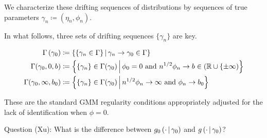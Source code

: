 \documentclass[11pt]{article}
\newcommand{\orange}[1]{\textcolor{OrangeRed1}{#1}}
\newcommand*{\R}{\mathbb{R}}
\newcommand{\mvert}[1][\middle]{\ensuremath{\,#1\vert\,}}
\begin{document}
We characterize these drifting sequences of distributions by sequences of true parameters $\gamma_n \coloneqq
(\eta_n, \phi_n)$.

In what follows, three sets of drifting sequences $\lbrace \gamma_n \rbrace$ are key. 

\begin{align}
    \Gamma\left(\gamma_0\right) &\coloneqq \left\lbrace \left\lbrace \gamma_n \in \Gamma \right\rbrace \mvert
        \gamma_n \to \gamma_0 \in \Gamma \right\rbrace\\ 
    \Gamma(\gamma_0, 0, b) &\coloneqq \left\lbrace \lbrace \gamma_n \rbrace \in \Gamma(\gamma_0) \mvert \phi_0 =
        0\ \text{and}\ n^{1/2} \phi_n \to b \in (\R \cup \lbrace \pm \infty) \right\rbrace \\
    \Gamma(\gamma_0, \infty, b_0) &\coloneqq \left\lbrace \lbrace \gamma_n \rbrace \in \Gamma (\gamma_0) \mvert
        n^{1/2} \phi_n \to \infty\ \text{and}\ \phi_n \to b_0 \right\rbrace 
\end{align}


These are the standard GMM regularity conditions appropriately adjusted for the lack of identification when $\phi
=0$.

\orange{Question (Xu):}
What is the difference between $g_0\left(\cdot \mvert \gamma_0\right)$ and $g\left(\cdot \mvert \gamma_0\right)$?
\end{document}
